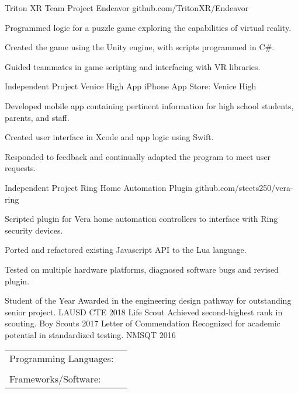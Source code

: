 \documentclass[]{awesome-cv}
\begin{document}
\begin{cventries}
	\cventry
	{Triton XR Team Project}
	{Endeavor}
	{}
	{github.com/TritonXR/Endeavor}
	{\begin{cvitems}
		\item {Programmed logic for a puzzle game exploring the capabilities of virtual reality.}
		\item {Created the game using the Unity engine, with scripts programmed in C\#.}
		\item {Guided teammates in game scripting and interfacing with VR libraries.}
		\end{cvitems}}
	\cventry
	{Independent Project}
	{Venice High App}
	{}
	{iPhone App Store: \textquotedbl{}Venice High\textquotedbl{}}
	{\begin{cvitems}
		\item {Developed mobile app containing pertinent information for high school students, parents, and staff.}
		\item {Created user interface in Xcode and app logic using Swift.}
		\item {Responded to feedback and continually adapted the program to meet user requests.}
		\end{cvitems}}
	\cventry
	{Independent Project}
	{Ring Home Automation Plugin}
	{}
	{github.com/steets250/vera-ring}
	{\begin{cvitems}
		\item {Scripted plugin for Vera home automation controllers to interface with Ring security devices.}
		\item {Ported and refactored existing Javascript API to the Lua language.}
		\item {Tested on multiple hardware platforms, diagnosed software bugs and revised plugin.}
		\end{cvitems}}
	\vspace{-5mm}
\end{cventries}

\begin{cvhonors}
	\cvhonor
	{Student of the Year}
	{Awarded in the engineering design pathway for outstanding senior project.}
	{LAUSD CTE}
	{2018}
	\cvhonor
	{Life Scout}
	{Achieved second-highest rank in scouting.}
	{Boy Scouts}
	{2017}
	\cvhonor
	{Letter of Commendation}
	{Recognized for academic potential in standardized testing.}
	{NMSQT}
	{2016}
\end{cvhonors}

\begin{cventries}
	\cventry
	{}
	{\def\arraystretch{1.15}{\begin{tabular}{ l l }
		Programming Languages:  & {\skill{ Java, Swift, C, Javascript, HTML/CSS, C\#, ARM}} \\
		 \\
		Frameworks/Software:  & {\skill{ Git/GitHub, Xcode, Node.js, React, Npm/Yarn, Unity}} \\
		\end{tabular}}}
	{}
	{}
	{}
\end{cventries}
\vspace{-7mm}
\ 
\end{document}

